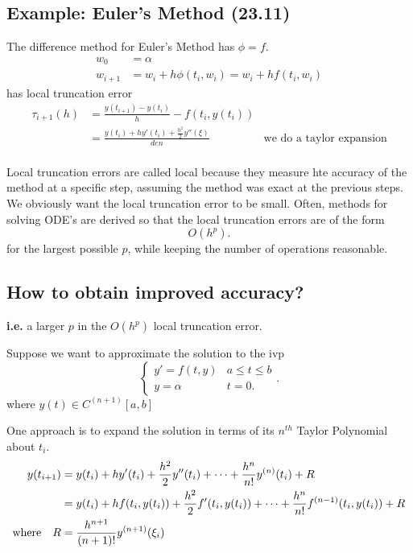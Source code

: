 \documentclass[12pt]{article}
\newcommand{\ie}{\textbf{i.e.}\xspace}
\begin{document}
\subsection{Example: Euler's Method (23.11)}
The difference method for Euler's Method has $\phi = f$.
\begin{align*}
  w_0 &= \alpha \\
  w_{i+1} &= w_i + h \phi(t_i, w_i) = w_i + h f(t_i, w_i)
\end{align*}
has local truncation error
\begin{align*}
  \tau_{i+1}(h) &= \frac{y(t_{i+1}) - y(t_i)}{h} - f(t_i, y(t_i)) \\
                &= \frac{y(t_i) + hy'(t_i) + \frac{h^2}{2}y''(\xi)}{den} & \text{we do a taylor expansion} \\
\end{align*}

Local truncation errors are called local because they measure hte accuracy of
the method at a specific step, assuming the method was exact at the previous
steps. We obviously want the local truncation error to be small. Often, methods
for solving ODE's are derived so that the local truncation errors are of the
form
\[
O(h^p)
.\]
for the largest possible $p$, while keeping the number of operations reasonable.

\subsection{How to obtain improved accuracy?}
\ie a larger $p$ in the $O(h^p)$ local truncation error.

Suppose we want to approximate the solution to the ivp 
\[
  \begin{cases}
    y' = f(t,y) & a \leq t \leq b\\
    y = \alpha & t = 0
  .\end{cases}
.\]
where $y(t) \in C^{(n+1)} [a,b]$

One approach is to expand the solution in terms of its $n^{th}$ Taylor
Polynomial about $t_i$.
\begin{align*}
	y(t_{i+1}) &= y(t_i) + h y'(t_i) + \frac{h^2}{2} y''(t_i) + \cdots + \frac{h^n}{n!} y^{(n)}(t_i) + R \\
		   &= y(t_i) + h f\pqty{t_i, y(t_i)} + \frac{h^2}{2} f'\pqty{t_i, y(t_i)} + \cdots + \frac{h^n}{n!} f^{(n-1)}\pqty{t_i, y(t_i)} + R \\
  \text{where} \quad R &= \frac{h^{n+1}}{(n+1)!} y^{(n+1)}\pqty{\xi_i}
\end{align*}
\end{document}
